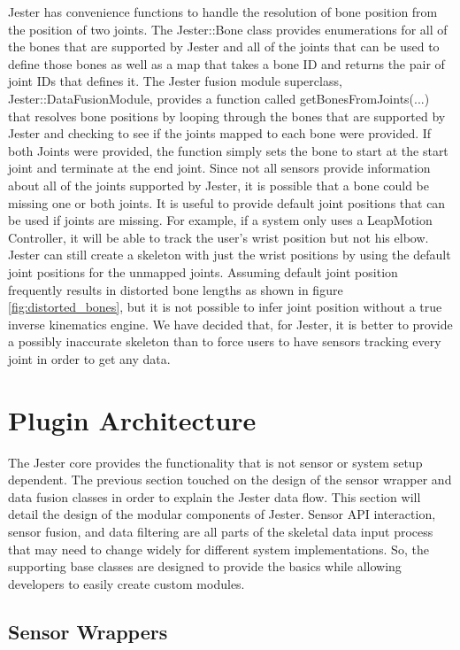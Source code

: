 Jester has convenience functions to handle the resolution of bone position from the position of two joints. The Jester::Bone class provides enumerations for all of the bones that are supported by Jester and all of the joints that can be used to define those bones as well as a map that takes a bone ID and returns the pair of joint IDs that defines it. The Jester fusion module superclass, Jester::DataFusionModule, provides a function called getBonesFromJoints(...) that resolves bone positions by looping through the bones that are supported by Jester and checking to see if the joints mapped to each bone were provided. If both Joints were provided, the function simply sets the bone to start at the start joint and terminate at the end joint. Since not all sensors provide information about all of the joints supported by Jester, it is possible that a bone could be missing one or both joints. It is useful to provide default joint positions that can be used if joints are missing. For example, if a system only uses a LeapMotion Controller, it will be able to track the user’s wrist position but not his elbow. Jester can still create a skeleton with just the wrist positions by using the default joint positions for the unmapped joints. Assuming default joint position frequently results in distorted bone lengths as shown in figure \ref{fig:distorted_bones}, but it is not possible to infer joint position without a true inverse kinematics engine. We have decided that, for Jester, it is better to provide a possibly inaccurate skeleton than to force users to have sensors tracking every joint in order to get any data.

\section{Plugin Architecture}

The Jester core provides the functionality that is not sensor or system setup dependent. The previous section touched on the design of the sensor wrapper and data fusion classes in order to explain the Jester data flow. This section will detail the design of the modular components of Jester. Sensor API interaction, sensor fusion, and data filtering are all parts of the skeletal data input process that may need to change widely for different system implementations. So, the supporting base classes are designed to provide the basics while allowing developers to easily create custom modules.

\subsection{Sensor Wrappers}\label{sec:sensor_wrappers}

